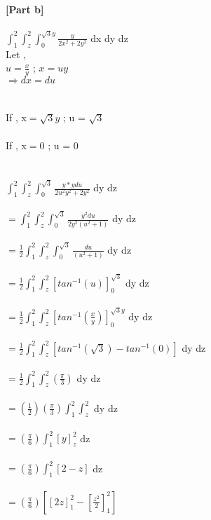 \documentclass{article}
\newcommand\tab[1][1cm]{\hspace*{#1}}
\begin{document}
\begin{homeworkProblem}
\newpage
\textbf{[Part b]}\\
    \vspace{5mm}\\
\tab $\int^2_1 \int^2_z \int^{\sqrt{3}y}_0 \frac{y}{2x^2 +2y^2} $ dx dy dz
\\

Let ,\\
$u = \frac{x}{y} $ ; $ x= uy$\\
$\Rightarrow dx = du $\\
\\
\\
If , x$ = \sqrt{3} y $ ; u = $\sqrt{3}$\\
\\ If , x$ =0 $   ; u = $0$\\
\\
\\ $\int^2_1 \int^2_z \int^{\sqrt{3}}_0 \frac{y * y du}{2 u^2 y^2 +2y^2}$ dy dz\\
\\ $ = \int^2_1 \int^2_z \int^{\sqrt{3}}_0 \frac{ y^2 du}{2 y^2(u^2 +1)}$ dy dz\\
\\ $ =\frac{1}{2} \int^2_1 \int^2_z \int^{\sqrt{3}}_0 \frac{  du}{(u^2 +1)}$ dy dz\\
\\ $ =\frac{1}{2} \int^2_1 \int^2_z \left[tan^{-1} (u)\right]^{\sqrt{3}}_0$ dy dz\\
\\ $ =\frac{1}{2} \int^2_1 \int^2_z \left[tan^{-1} (\frac{x}{y})\right]^{\sqrt{3}y}_0$ dy dz\\
\\ $ =\frac{1}{2} \int^2_1 \int^2_z \left[tan^{-1} (\sqrt{3}) - tan^{-1}( 0)\right]$ dy dz\\
\\ $ =\frac{1}{2} \int^2_1 \int^2_z \left(\frac{\pi}{3}\right)$ dy dz\\
\\ $ =\left(\frac{1}{2}\right) \left(\frac{\pi}{3}\right) \int^2_1 \int^2_z $ dy dz\\
\\ $ =\left(\frac{\pi}{6}\right) \int^2_1 \left[y\right]^2_z $  dz\\
\\ $ =\left(\frac{\pi}{6}\right) \int^2_1 \left[2-z\right] $  dz\\
\\ $ =\left(\frac{\pi}{6}\right) \left[\left[2z\right]^2_1 - \left[\frac{z^2}{2}\right]^2_1\right] $  \\

\end{homeworkProblem}
\end{document}
